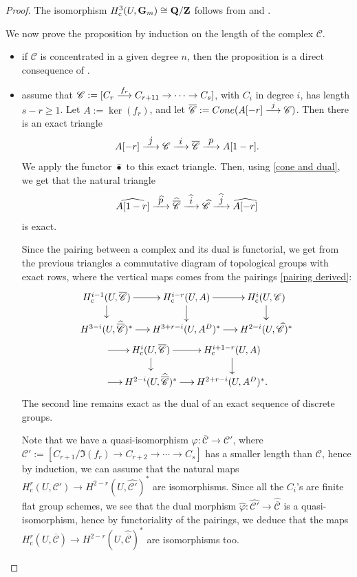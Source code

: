 \documentclass[10pt,a4paper]{amsart}
\let\mathcal\mathscr
\newcommand\To[1]{\mathchoice{\xrightarrow{\textstyle\kern4pt#1\kern3pt}}{\stackrel{#1}{\longrightarrow}}{}{}}
\newcommand{\sbullet}{{\scriptscriptstyle\bullet}}
\newcommand{\rc}{\mathrm{c}}
\theoremstyle{plain}
\theoremstyle{definition}
\newcommand \ZZ {\mathbf{Z}}
\newcommand \QQ {\mathbf{Q}}
\newcommand \cC {\mathcal{C}}
\begin{document}
\begin{proof}
The isomorphism $H^3_\rc(U,\G) \cong \QQ/\ZZ$ follows from \cite[Prop.\,II.2.6]{MilADT} and \cite[Prop.\,2.1\,(4)]{DemH}.

We now prove the proposition by induction on the length of the complex $\cC$.
\begin{itemize}
\item if $\cC$ is concentrated in a given degree $n$, then the proposition is a direct consequence of \cite[Th.\,1.1]{DemH}.
\item assume that $\cC:= [C_r \To{f_r} C_{r+11} \to \cdots\to C_s]$, with $C_i$ in degree $i$, has length $s-r \geq 1$.
Let $A:= \ker(f_r)$, and let $\overline{\cC}:= \textup{Cone}(A[-r] \To{j} \cC)$. Then there is an exact triangle\vspace*{-3pt}
\[
A[-r] \To{j} \cC \To{i} \overline{\cC} \To{p} A[1-r].
\]
We apply the functor $\widehat{\sbullet}$ to this exact triangle. Then, using \eqref{cone and dual}, we get that the natural triangle\vspace*{-3pt}
\[
\widehat{A[1-r]} \To{\widehat{p}} \widehat{\overline{\cC}} \To{\widehat{i}} \widehat{\cC} \To{\widehat{j}} \widehat{A[-r]}
\]
is exact.

Since the pairing between a complex and its dual is functorial, we get from the previous triangles a commutative diagram of topological groups with exact rows, where the vertical maps comes from the pairings \eqref{pairing derived}:\vspace*{-3pt}
\begin{multline} \label{devissage AMM1}
\begin{array}{c}
\xymatrix@=5mm{
H^{i-1}_\rc(U, \overline{\cC}) \ar[r] \ar[d] & H^{i-r}_\rc(U, A) \ar[r] \ar[d] & H^i_\rc(U, \cC)\ar[d] \\
H^{3-i}(U, \widehat{\overline{\cC}})^* \ar[r] & H^{3+r-i}(U, A^D)^* \ar[r] & H^{2-i}(U, \widehat{\cC})^*
}
\end{array}\\
\xymatrix@=5mm{
\mbox{}\ar[r] & H^{i}_\rc(U, \overline{\cC}) \ar[r] \ar[d] & H^{i+1-r}_\rc(U, A) \ar[d] \\
\mbox{}\ar[r] & H^{2-i}(U, \widehat{\overline{\cC}})^* \ar[r] & H^{2+r-i}(U, A^D)^*.
}
\end{multline}
The second line remains exact as the dual of an exact sequence of discrete groups.

Note that we have a quasi-isomorphism $\varphi: \overline{\cC} \to \cC'$, where $\cC':= [C_{r+1}/\Im(f_r) \to C_{r+2} \to \cdots\to C_s]$ has a smaller length than $\cC$, hence by induction, we can assume that the natural maps $H^r_\rc(U, \cC') \to H^{2-r}(U, \widehat{\cC'})^*$ are isomorphisms. Since all the $C_i$'s are finite flat group schemes, we see that the dual morphism $\widehat{\varphi}: \widehat{\cC'} \to \widehat{\overline{\cC}}$ is a quasi-isomorphism, hence by functoriality of the pairings, we deduce that the maps $H^r_\rc(U, \overline{\cC}) \to H^{2-r}(U, \widehat{\overline{\cC}})^*$ are isomorphisms too.


\end{itemize}
\end{proof}
\end{document}
